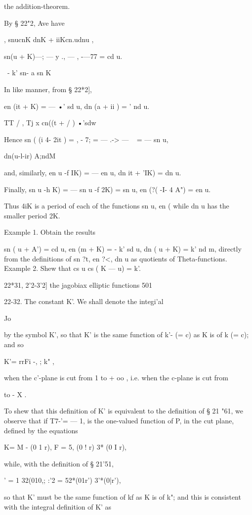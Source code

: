 the addition-theorem.

By § 22"2, Ave have

 , snucnK dnK + iiKcn.udnu ,

sn(u + K)—; — y ., — , -—77 = cd u.

  \ - k' sn- a sn K

In like manner, from § 22*2],

en (it + K) = — •' sd u, dn (a + ii ) = ' nd u.

TT / , Tj x cn((t + / ) •'sdw

Hence sn ( (i 4- 2it ) = , - 7; = — .-> — ~ = — sn u,

  dn(u-l-ir) A;ndM

and, similarly, en u -f IK) = — en u, dn it + 'IK) = dn u.

Finally, sn u -h K) = — sn u -f 2K) = sn u, en (?( -I- 4 A") = en u.

Thus 4iK is a period of each of the functions sn u, en ( while dn u
has the smaller period 2K.

Example 1. Obtain the results

sn ( u + A') = cd u, en (m + K) = - k' sd u, dn ( u + K) = k' nd m,
directly from the definitions of sn ?t, en ?<, dn u as quotients of
Theta-functions. Example 2. Shew that cs u cs ( K — u) = k'.

22*31, 2'2-3'2] the jagobiax elliptic functions 501

22-32. The constant K'. We shall denote the integi'al

Jo

by the symbol K', so that K' is the same function of k'- (= c) as K is
of k (= c); and so

K'= rrFi -, ; k" ,

when the c'-plane is cut from 1 to + oo , i.e. when the c-plane is cut
from

to - X .

To shew that this definition of K' is equivalent to the definition of
§ 21 "61, we observe that if T7-'= — 1, is the one-valued function of
P, in the cut plane, defined by the equations

K= M - (0 1 r), F = 5, (0 ! r) 3* (0 I r),

while, with the definition of § 21'51,

 ' = 1 32(010,; :'2 = 52*(01r') 3'*(0|r'),

so that K' must be the same function of kf as K is of k"; and this is
consistent with the integral definition of K' as

